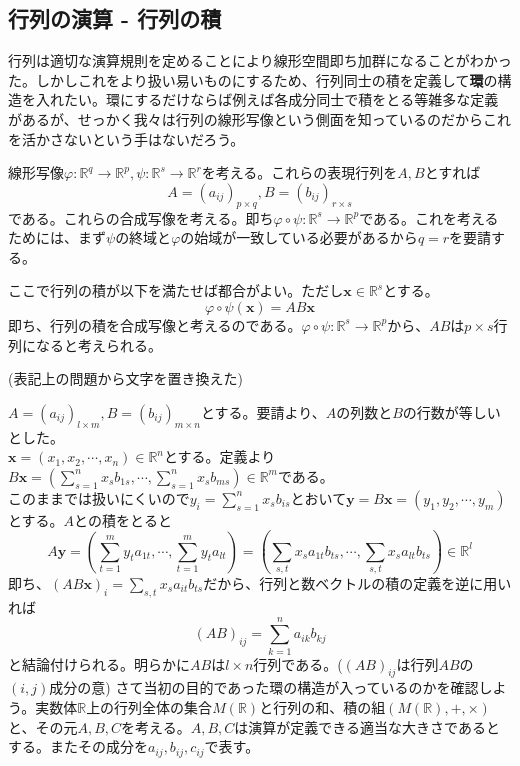 \documentclass[dvipdfmx]{jsarticle}
\begin{document}
\subsection{行列の演算 - 行列の積}
\motiv 行列は適切な演算規則を定めることにより線形空間即ち加群になることがわかった。しかしこれをより扱い易いものにするため、行列同士の積を定義して\textbf{環}の構造を入れたい。環にするだけならば例えば各成分同士で積をとる等雑多な定義があるが、せっかく我々は行列の線形写像という側面を知っているのだからこれを活かさないという手はないだろう。\par
線形写像$\varphi:\mathbb{R}^q\to\mathbb{R}^p, \psi:\mathbb{R}^s\to\mathbb{R}^r$を考える。これらの表現行列を$A,B$とすれば
\[A=(a_{ij})_{p \times q}, B=(b_{ij})_{r \times s}\]
である。これらの合成写像を考える。即ち$\varphi\circ\psi:\mathbb{R}^s\to\mathbb{R}^p$である。これを考えるためには、まず$\psi$の終域と$\varphi$の始域が一致している必要があるから$q=r$を要請する。\par
ここで行列の積が以下を満たせば都合がよい。ただし$\bm{x}\in\mathbb{R}^s$とする。
\[\varphi\circ\psi(\bm{x})=AB\bm{x}\]
即ち、行列の積を合成写像と考えるのである。$\varphi\circ\psi:\mathbb{R}^s\to\mathbb{R}^p$から、$AB$は$p \times s$行列になると考えられる。\\\par
\Build(表記上の問題から文字を置き換えた)\vspace{3pt}\par
$A=(a_{ij})_{l \times m}, B=(b_{ij})_{m \times n}$とする。要請より、$A$の列数と$B$の行数が等しいとした。\\
$\bm{x}=(x_1,x_2,\cdots,x_n)\in\mathbb{R}^n$とする。定義より$B\bm{x}=(\displaystyle\sum_{s=1}^nx_sb_{1s},\cdots,\displaystyle\sum_{s=1}^nx_sb_{ms})\in\mathbb{R}^m$である。\\
このままでは扱いにくいので$y_i=\displaystyle\sum_{s=1}^nx_sb_{is}$とおいて$\bm{y}=B\bm{x}=(y_1,y_2,\cdots,y_m)$とする。$A$との積をとると\\
\[A\bm{y}=(\sum_{t=1}^my_ta_{1t},\cdots,\sum_{t=1}^my_ta_{lt})=(\sum_{s,t}x_sa_{1t}b_{ts},\cdots,\sum_{s,t}x_sa_{lt}b_{ts})\in\mathbb{R}^l\]
即ち、$(AB\bm{x})_i=\displaystyle\sum_{s,t}x_sa_{it}b_{ts}$だから、行列と数ベクトルの積の定義を逆に用いれば
\[(AB)_{ij}=\sum_{k=1}^na_{ik}b_{kj}\]
と結論付けられる。明らかに$AB$は$l \times n$行列である。($(AB)_{ij}$は行列$AB$の$(i,j)$成分の意)\newpage
さて当初の目的であった環の構造が入っているのかを確認しよう。実数体$\mathbb{R}$上の行列全体の集合$M(\mathbb{R})$と行列の和、積の組$(M(\mathbb{R}),+,\times)$と、その元$A,B,C$を考える。$A,B,C$は演算が定義できる適当な大きさであるとする。またその成分を$a_{ij},b_{ij},c_{ij}$で表す。\\\par
\end{document}
